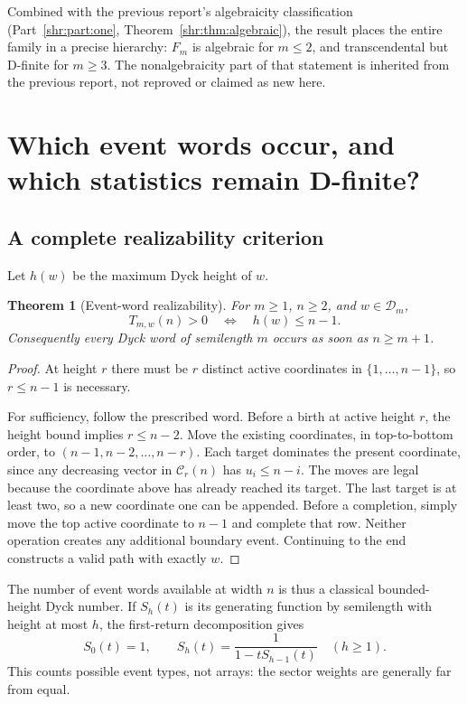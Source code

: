 \documentclass[11pt,letterpaper]{article}
\numberwithin{equation}{section}
\newtheorem{theorem}{Theorem}[section]
\theoremstyle{definition}
\newcommand{\1}{\mathbf 1}
\begin{document}
Combined with the previous report's algebraicity classification
(Part~\ref{shr:part:one}, Theorem~\ref{shr:thm:algebraic}), the result places the entire family in a precise hierarchy:
$F_m$ is algebraic for $m\le2$, and transcendental but D-finite for
$m\ge3$. The nonalgebraicity part of that statement is inherited from the
previous report, not reproved or claimed as new here.

\section{Which event words occur, and which statistics remain D-finite?}
\label{shr:bp:sec:words}

\subsection{A complete realizability criterion}
Let $h(w)$ be the maximum Dyck height of $w$.
\begin{theorem}[Event-word realizability]
\label{shr:bp:thm:realizability}
For $m\ge1$, $n\ge2$, and $w\in\mathcal D_m$,
\begin{equation}
 T_{m,w}(n)>0\quad\Longleftrightarrow\quad h(w)\le n-1.
 \label{shr:bp:eq:realizability}
\end{equation}
Consequently every Dyck word of semilength $m$ occurs as soon as $n\ge m+1$.
\end{theorem}
\begin{proof}
At height $r$ there must be $r$ distinct active coordinates in
$\{1,\ldots,n-1\}$, so $r\le n-1$ is necessary.

For sufficiency, follow the prescribed word. Before a birth at active
height $r$, the height bound implies $r\le n-2$. Move the existing
coordinates, in top-to-bottom order, to
$(n-1,n-2,\ldots,n-r)$. Each target dominates the present coordinate, since
any decreasing vector in $\mathcal C_r(n)$ has $u_i\le n-i$. The moves
are legal because the coordinate above has already reached its target.
The last target is at least two, so a new coordinate one can be appended.
Before a completion, simply move the top active coordinate to $n-1$ and
complete that row. Neither operation creates any additional boundary
event. Continuing to the end constructs a valid path with exactly $w$.
\end{proof}

The number of event words available at width $n$ is thus a classical
bounded-height Dyck number. If $S_h(t)$ is its generating function by
semilength with height at most $h$, the first-return decomposition gives
\begin{equation}
 S_0(t)=1,\qquad S_h(t)=\frac1{1-tS_{h-1}(t)}\quad(h\ge1).
 \label{shr:bp:eq:boundedDyck}
\end{equation}
This counts possible event types, not arrays: the sector weights are
generally far from equal.
\end{document}
